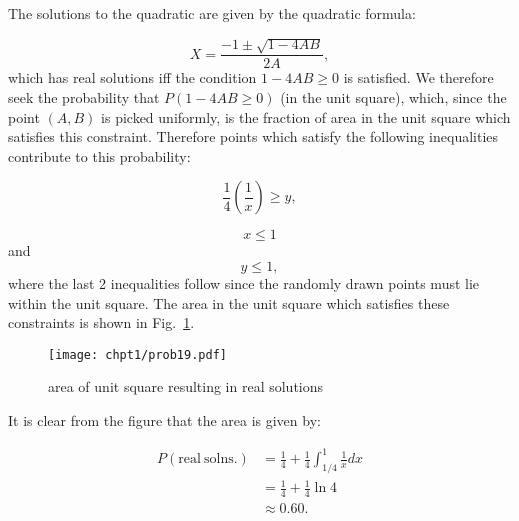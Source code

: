 \begin{problem}{19} The solutions to the quadratic are given by the quadratic formula:

	\begin{equation}
		X = \frac{-1 \pm \sqrt{1-4AB}}{2A},
	\end{equation}
	which has real solutions iff the condition $1-4AB \ge 0$ is satisfied.  We therefore seek the probability that $P(1-4AB\ge 0)$ (in the unit square), which, since the point $(A, B)$ is picked uniformly, is the fraction of area in the unit square which satisfies this constraint.  Therefore points which satisfy the following inequalities contribute to this probability:

	\begin{equation*}
		\frac{1}{4} \left(\frac{1}{x} \right)\ge y,
	\end{equation*}
	
	\begin{equation*}
		x\le1
	\end{equation*}
	and
		\begin{equation*}
		y\le1,
	\end{equation*}
where the last 2 inequalities follow since the randomly drawn points must lie within the unit square.  The area in the unit square which satisfies these constraints is shown in Fig.~\ref{fig:prob_19}.


	\begin{figure}[t]
	\centering
      		 \texttt{[image: chpt1/prob19.pdf]}
  			  \caption{area of unit square resulting in real solutions}
    			   \label{fig:prob_19}
	\end{figure}
It is clear from the figure that the area is given by:

\begin{align*}
	P(\mathrm{real~solns.}) & = \frac{1}{4} +\frac{1}{4}\int_{1/4}^1\frac{1}{x} dx \\
	& = \frac{1}{4}+\frac{1}{4} \ln 4 \\
	& \approx 0.60.
\end{align*}
	
\end{problem} 


